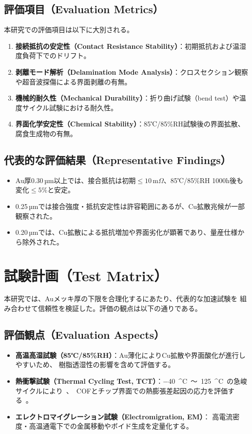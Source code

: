 \documentclass[conference]{IEEEtran}
\begin{document}
\subsection*{評価項目（Evaluation Metrics）}
本研究での評価項目は以下に大別される。
\begin{enumerate}
  \item \textbf{接続抵抗の安定性（Contact Resistance Stability）}：初期抵抗および温湿度負荷下でのドリフト。
  \item \textbf{剥離モード解析（Delamination Mode Analysis）}：クロスセクション観察や超音波探傷による界面剥離の有無。
  \item \textbf{機械的耐久性（Mechanical Durability）}：折り曲げ試験（bend test）や温度サイクル試験における耐久性。
  \item \textbf{界面化学安定性（Chemical Stability）}：85℃/85\%RH試験後の界面拡散、腐食生成物の有無。
\end{enumerate}

\subsection*{代表的な評価結果（Representative Findings）}
\begin{itemize}
  \item Au厚0.30\,µm以上では、接合抵抗は初期$\leq 10\,\mathrm{m}\Omega$、85℃/85\%RH 1000h後も変化$\leq 5\%$と安定。
  \item 0.25\,µmでは接合強度・抵抗安定性は許容範囲にあるが、Cu拡散兆候が一部観察された。
  \item 0.20\,µmでは、Cu拡散による抵抗増加や界面劣化が顕著であり、量産仕様から除外された。
\end{itemize}

\section{試験計画（Test Matrix）}
本研究では、Auメッキ厚の下限を合理化するにあたり、代表的な加速試験を
組み合わせて信頼性を検証した。評価の観点は以下の通りである。

\subsection*{評価観点（Evaluation Aspects）}
\begin{itemize}
  \item \textbf{高温高湿試験（85℃/85\%RH）}：Au薄化によりCu拡散や界面酸化が進行しやすいため、
  樹脂透湿性の影響を含めて評価する。
  \item \textbf{熱衝撃試験（Thermal Cycling Test, TCT）}：\SI{-40}{^\circ C}～\SI{125}{^\circ C}の急峻サイクルにより、
  COFとチップ界面での熱膨張差起因の応力を評価する。
  \item \textbf{エレクトロマイグレーション試験（Electromigration, EM）}：
  高電流密度・高温通電下での金属移動やボイド生成を定量化する。
\end{itemize}
\end{document}
